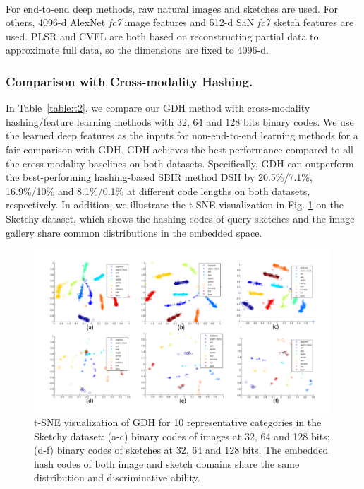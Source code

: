 \documentclass[runningheads]{llncs}
\begin{document}
\begin{table}[t]
\begin{center}
{  }
\label{table:t2}
\scriptsize \\
For end-to-end deep methods, raw natural images and sketches are used.  For others, 4096-d AlexNet \emph{fc7} image features and 512-d SaN \emph{fc7} sketch features are used. PLSR and CVFL are both based on reconstructing partial data to approximate full data, so the dimensions are fixed to 4096-d.
\vspace{-6ex}
\end{center}
\end{table}




\vspace{-2ex}
\subsubsection{Comparison with Cross-modality Hashing.} In Table~\ref{table:t2}, we compare our GDH method with cross-modality hashing/feature learning methods with 32, 64 and 128 bits binary codes. We use the learned deep features as the inputs for non-end-to-end learning methods for a fair comparison with GDH. GDH achieves the best performance compared to all the cross-modality baselines on both datasets. Specifically, GDH can outperform  the best-performing hashing-based SBIR method DSH \cite{LiuSSLS17}by 20.5\%/7.1\%, 16.9\%/10\% and
8.1\%/0.1\% at different code lengths on both datasets, respectively. In addition, we illustrate the t-SNE visualization in Fig. \ref{fig:tsne-figure} on the Sketchy dataset, which shows the hashing codes of query sketches and the image gallery share common distributions in the embedded space.



\begin{figure}[t]
 \vspace{-2ex}
    \centering
    \includegraphics[width = 0.99\textwidth]{figures/tsne.pdf}
    \vspace{-4ex}
    \caption{t-SNE visualization of GDH for 10 representative categories in the Sketchy dataset: (a-c) binary codes of images at 32, 64 and 128 bits; (d-f) binary codes of sketches at 32, 64 and 128 bits. The embedded hash codes of both image and sketch domains share the same distribution and discriminative ability.}
    \label{fig:tsne-figure}
\end{figure}
\end{document}

